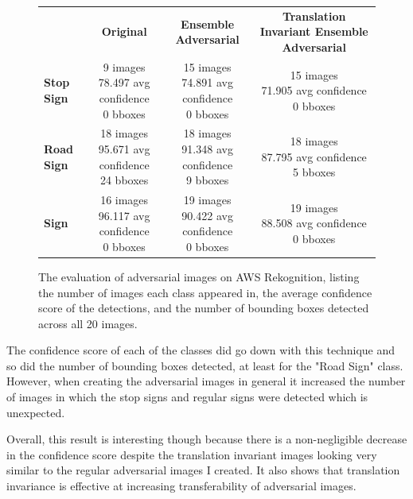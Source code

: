 \documentclass{article}
\begin{document}
\begin{figure}
\centering
\begin{tabular}{l c c c}
    & \textbf{Original} & \textbf{Ensemble Adversarial} & \textbf{Translation Invariant Ensemble Adversarial} \\
    \textbf{Stop Sign} & \makecell{9 images \\ 78.497 avg confidence \\ 0 bboxes} & \makecell{15 images \\ 74.891 avg confidence \\ 0 bboxes} & \makecell{15 images \\ 71.905 avg confidence \\ 0 bboxes} \\[1cm]
    \textbf{Road Sign} & \makecell{18 images \\ 95.671 avg confidence \\ 24 bboxes} & \makecell{18 images \\ 91.348 avg confidence \\ 9 bboxes} & \makecell{18 images \\ 87.795 avg confidence \\ 5 bboxes} \\[1cm]
    \textbf{Sign} & \makecell{16 images \\ 96.117 avg confidence \\ 0 bboxes} & \makecell{19 images \\ 90.422 avg confidence \\ 0 bboxes} & \makecell{19 images \\ 88.508 avg confidence \\ 0 bboxes} \\[1cm]
\end{tabular}
\caption{The evaluation of adversarial images on AWS Rekognition, listing the number of images each class appeared in, the average confidence score of the detections, and the number of bounding boxes detected across all 20 images.}
\label{fig:awsEval}
\end{figure}

The confidence score of each of the classes did go down with this technique and so did the number of bounding boxes detected, at least for the "Road Sign" class. However, when creating the adversarial images in general it increased the number of images in which the stop signs and regular signs were detected which is unexpected.

Overall, this result is interesting though because there is a non-negligible decrease in the confidence score despite the translation invariant images looking very similar to the regular adversarial images I created. It also shows that translation invariance is effective at increasing transferability of adversarial images.
\end{document}
